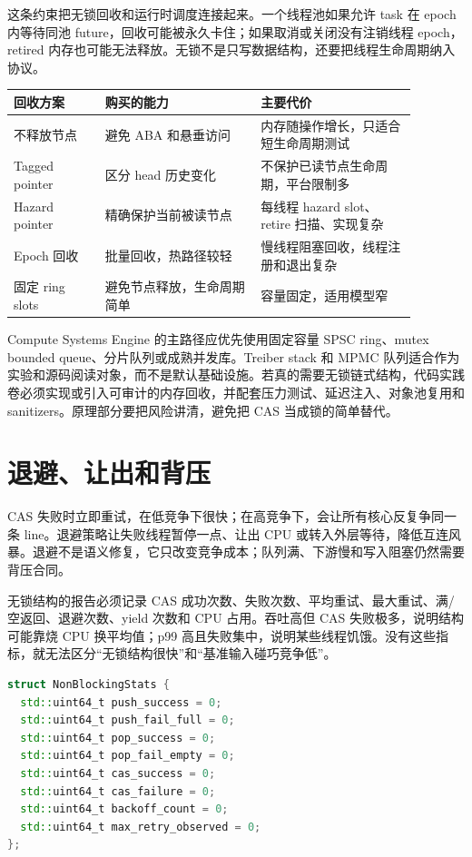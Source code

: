这条约束把无锁回收和运行时调度连接起来。一个线程池如果允许 task 在 epoch 内等待同池 future，回收可能被永久卡住；如果取消或关闭没有注销线程 epoch，retired 内存也可能无法释放。无锁不是只写数据结构，还要把线程生命周期纳入协议。

\begin{center}
\begin{tabular}{p{0.20\linewidth}p{0.34\linewidth}p{0.34\linewidth}}
\toprule
回收方案 & 购买的能力 & 主要代价 \\
\midrule
不释放节点 & 避免 ABA 和悬垂访问 & 内存随操作增长，只适合短生命周期测试 \\
Tagged pointer & 区分 head 历史变化 & 不保护已读节点生命周期，平台限制多 \\
Hazard pointer & 精确保护当前被读节点 & 每线程 hazard slot、retire 扫描、实现复杂 \\
Epoch 回收 & 批量回收，热路径较轻 & 慢线程阻塞回收，线程注册和退出复杂 \\
固定 ring slots & 避免节点释放，生命周期简单 & 容量固定，适用模型窄 \\
\bottomrule
\end{tabular}
\end{center}

Compute Systems Engine 的主路径应优先使用固定容量 SPSC ring、mutex bounded queue、分片队列或成熟并发库。Treiber stack 和 MPMC 队列适合作为实验和源码阅读对象，而不是默认基础设施。若真的需要无锁链式结构，代码实践卷必须实现或引入可审计的内存回收，并配套压力测试、延迟注入、对象池复用和 sanitizers。原理部分要把风险讲清，避免把 CAS 当成锁的简单替代。

\section{退避、让出和背压}

CAS 失败时立即重试，在低竞争下很快；在高竞争下，会让所有核心反复争同一条 line。退避策略让失败线程暂停一点、让出 CPU 或转入外层等待，降低互连风暴。退避不是语义修复，它只改变竞争成本；队列满、下游慢和写入阻塞仍然需要背压合同。

无锁结构的报告必须记录 CAS 成功次数、失败次数、平均重试、最大重试、满/空返回、退避次数、yield 次数和 CPU 占用。吞吐高但 CAS 失败极多，说明结构可能靠烧 CPU 换平均值；p99 高且失败集中，说明某些线程饥饿。没有这些指标，就无法区分“无锁结构很快”和“基准输入碰巧竞争低”。

\begin{lstlisting}[language=C++,caption={无锁结构的运行指标}]
struct NonBlockingStats {
  std::uint64_t push_success = 0;
  std::uint64_t push_fail_full = 0;
  std::uint64_t pop_success = 0;
  std::uint64_t pop_fail_empty = 0;
  std::uint64_t cas_success = 0;
  std::uint64_t cas_failure = 0;
  std::uint64_t backoff_count = 0;
  std::uint64_t max_retry_observed = 0;
};
\end{lstlisting}

